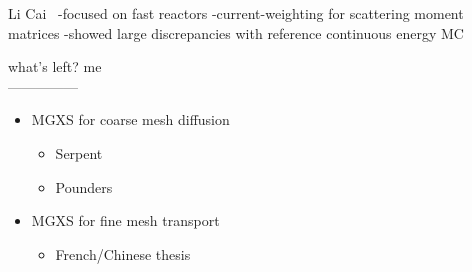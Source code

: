 Li Cai~\cite{cai2014condensation}
-focused on fast reactors
-current-weighting for scattering moment matrices
-showed large discrepancies with reference continuous energy MC

what's left? me\\
---------------\\


\begin{itemize}[noitemsep]
  \item \ac{MGXS} for coarse mesh diffusion
  \begin{itemize}[noitemsep]
    \item Serpent
    \item Pounders
  \end{itemize}
  \item \ac{MGXS} for fine mesh transport
  \begin{itemize}[noitemsep]
    \item French/Chinese thesis
  \end{itemize}
\end{itemize}